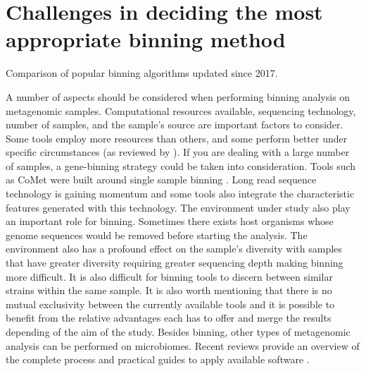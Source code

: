\documentclass{article}
\begin{document}
\section{Challenges in deciding the most appropriate binning method}
\begin{table}
\begin{tiny}
\centering
\caption[Comparison of popular binning algorithms updated since 2017]{Comparison of popular binning algorithms updated since 2017.}
	
\label{Tbinningsoftware}
\end{tiny}
\end{table}
A number of aspects should be considered when performing binning analysis on metagenomic samples.
Computational resources available, sequencing technology, number of samples, and the sample's source are important factors to consider.
Some tools employ more resources than others, and some perform better under specific circumstances (as reviewed by ).
If you are dealing with a large number of samples, a gene-binning strategy could be taken into consideration.
Tools such as CoMet were built around single sample binning \cite{herath2017comet}.
Long read sequence technology is gaining momentum and some tools also integrate the characteristic features generated with this technology.
The environment under study also play an important role for binning.
Sometimes there exists host organisms whose genome sequences would be removed before starting the analysis.
The environment also has a profound effect on the sample's diversity with samples that have greater diversity requiring greater sequencing depth making binning more difficult.
It is also difficult for binning tools to discern between similar strains within the same sample.  
It is also worth mentioning that there is no mutual exclusivity between the currently available tools and it is possible to benefit from the relative advantages each has to offer and merge the results depending of the aim of the study.
Besides binning, other types of metagenomic analysis can be performed on microbiomes.
Recent reviews provide an overview of the complete process and practical guides to apply available software \cite{breitwieser2019review}.  
\end{document}
